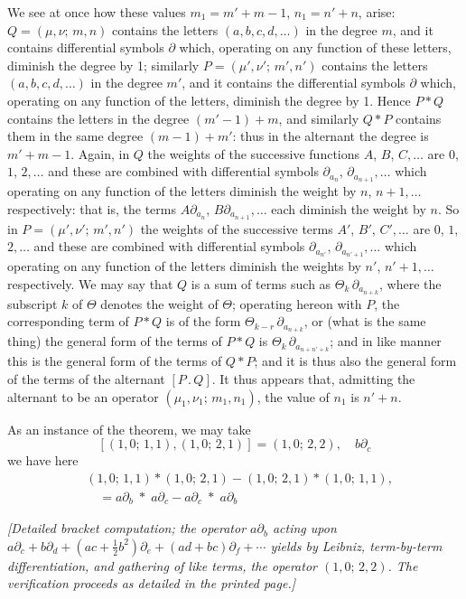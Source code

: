 \documentclass[11pt]{article}
\begin{document}
\medskip
We see at once how these values $m_{1}=m'+m-1$, $n_{1}=n'+n$, arise: $Q=(\mu,\nu;\,m,n)$ contains the letters $(a,b,c,d,\ldots)$ in the degree $m$, and it contains differential symbols $\partial$ which, operating on any function of these letters, diminish the degree by 1; similarly $P=(\mu',\nu';\,m',n')$ contains the letters $(a,b,c,d,\ldots)$ in the degree $m'$, and it contains the differential symbols $\partial$ which, operating on any function of the letters, diminish the degree by 1. Hence $P*Q$ contains the letters in the degree $(m'-1)+m$, and similarly $Q*P$ contains them in the same degree $(m-1)+m'$: thus in the alternant the degree is $m'+m-1$. Again, in $Q$ the weights of the successive functions $A$, $B$, $C,\ldots$ are $0$, $1$, $2,\ldots$ and these are combined with differential symbols $\partial_{a_{n}}$, $\partial_{a_{n+1}},\ldots$ which operating on any function of the letters diminish the weight by $n$, $n+1,\ldots$ respectively: that is, the terms $A\partial_{a_{n}}$, $B\partial_{a_{n+1}},\ldots$ each diminish the weight by $n$. So in $P=(\mu',\nu';\,m',n')$ the weights of the successive terms $A'$, $B'$, $C',\ldots$ are $0$, $1$, $2,\ldots$ and these are combined with differential symbols $\partial_{a_{n'}}$, $\partial_{a_{n'+1}},\ldots$ which operating on any function of the letters diminish the weights by $n'$, $n'+1,\ldots$ respectively. We may say that $Q$ is a sum of terms such as $\Theta_{k}\,\partial_{a_{n+k}}$, where the subscript $k$ of $\Theta$ denotes the weight of $\Theta$; operating hereon with $P$, the corresponding term of $P*Q$ is of the form $\Theta_{k-r}\,\partial_{a_{n+k}}$, or (what is the same thing) the general form of the terms of $P*Q$ is $\Theta_{k}\,\partial_{a_{n+n'+k}}$; and in like manner this is the general form of the terms of $Q*P$; and it is thus also the general form of the terms of the alternant $[P\,.\,Q]$. It thus appears that, admitting the alternant to be an operator $(\mu_{1},\nu_{1};\,m_{1},n_{1})$, the value of $n_{1}$ is $n'+n$.

\medskip
As an instance of the theorem, we may take
\[ [(1,0;\,1,1),(1,0;\,2,1)] = (1,0;\,2,2),\quad b\partial_{c} \]
we have here
\begin{align*}
&(1,0;\,1,1)*(1,0;\,2,1) - (1,0;\,2,1)*(1,0;\,1,1),\\
&\quad = a\partial_{b}\;*\;a\partial_{c} - a\partial_{c}\;*\;a\partial_{b}
\end{align*}

\medskip
\textit{[Detailed bracket computation; the operator $a\partial_{b}$ acting upon $a\partial_{c}+b\partial_{d}+(ac+\tfrac{1}{2}b^{2})\partial_{e}+(ad+bc)\partial_{f}+\cdots$ yields by Leibniz, term-by-term differentiation, and gathering of like terms, the operator $(1,0;\,2,2)$. The verification proceeds as detailed in the printed page.]}
\end{document}
